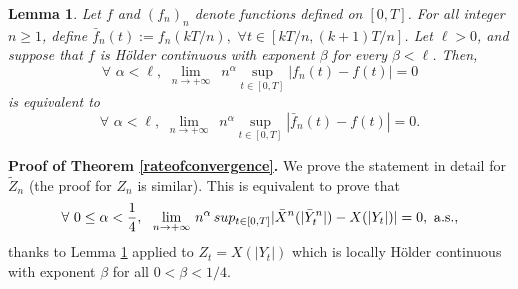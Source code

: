 \documentclass[a4paper, 11pt]{article}
\newtheorem{lem}{Lemma}
\newcommand{\1}{\mathbf{1}}
\begin{document}
\begin{lem}
\label{lem:1}
Let $f$ and $(f_n)_n$ denote functions defined on $[0, T]$. For all integer $n\geq 1$, define $\bar{f}_n(t):=f_n(kT/n),\, \, \forall t\in[kT/n, (k+1)T/n]$. Let $\ell>0$, and suppose that $f$ is H\" older continuous with exponent $\beta$ for every $\beta<\ell$. Then,
\begin{equation*}
\forall\, \,  \alpha<\ell,\, \,  \lim_{n\rightarrow +\infty}  \, \, \, n^\alpha \sup_{t\in[0,T]} |f_n(t)-f(t)|=0
\end{equation*}
is equivalent to
\begin{equation*}
\forall\, \,  \alpha<\ell,\, \, \lim_{n\rightarrow +\infty}  \, \, \, n^\alpha \sup_{t\in[0,T]} |\bar{f}_n(t)-f(t)|=0.
\end{equation*}
\end{lem}

\noindent\textbf{Proof of Theorem \ref{rateofconvergence}.}
We prove the statement in detail for ${\tilde Z}_n$ (the proof for $Z_n$ is similar). This is equivalent to prove that 
\begin{equation*}
\forall \, \, 0\leq \alpha < \frac{1}{4}, \,  \, \, \,  \lim_{n\rightarrow +\infty}  \,  n^\alpha \, sup_{t\in [0,T]} {|\bar{X}^n(|\bar{Y}_t^n|)-X(|Y_t|)|}=0,\, \,  {\rm a.s.},
\end{equation*}
thanks to Lemma \ref{lem:1} applied to $Z_t=X(|Y_t|)$ which is locally H\" older continuous with exponent $\beta$ for all $0<\beta<1/4$.
\end{document}
